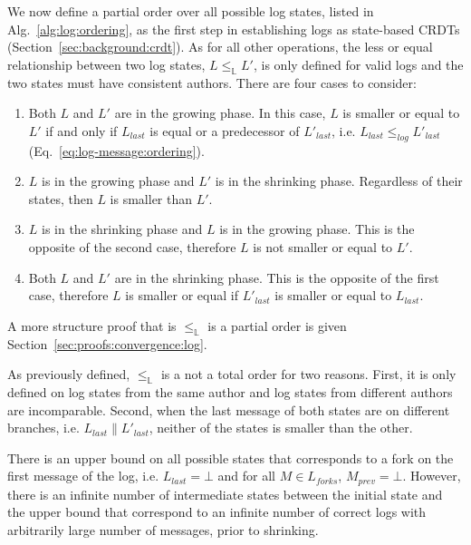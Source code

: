 \documentclass[9pt, oneside]{article}   	%
\begin{document}
We now define a partial order over all possible log states, listed in Alg.~\ref{alg:log:ordering}, as the first step in establishing logs as state-based CRDTs (Section~\ref{sec:background:crdt}). As for all other operations, the less or equal relationship between two log states, $L \leq_\mathds{L} L'$, is only defined for valid logs and the two states must have consistent authors. There are four cases to consider:
\begin{enumerate}
	\item Both $L$ and $L'$ are in the growing phase. In this case, $L$ is smaller or equal to $L'$ if and only if $L_\textit{last}$ is equal or a predecessor of $L'_\textit{last}$, i.e. $L_\textit{last} \leq_\textit{log} L'_\textit{last}$ (Eq.~\ref{eq:log-message:ordering}).

	\item $L$ is in the growing phase and $L'$ is in the shrinking phase. Regardless of their states, then $L$ is smaller than $L'$.

	\item $L$ is in the shrinking phase and $L$ is in the growing phase. This is the opposite of the second case, therefore $L$ is not smaller or equal to $L'$.
	\item Both $L$ and $L'$ are in the shrinking phase. This is the opposite of the first case, therefore $L$ is smaller or equal if $L'_\textit{last}$ is smaller or equal to $L_\textit{last}$. 
\end{enumerate}

A more structure proof that is $\leq_\mathds{L}$ is a partial order is given Section~\ref{sec:proofs:convergence:log}.

As previously defined, $\leq_\mathds{L}$ is a not a total order for two reasons. First, it is only defined on log states from the same author and log states from different authors are incomparable. Second, when the last message of both states are on different branches, i.e. $L_\textit{last} \parallel L'_\textit{last}$, neither of the states is smaller than the other.

There is an upper bound on all possible states that corresponds to a fork on the first message of the log,  i.e. $L_\textit{last} = \bot$ and for all $M \in L_\textit{forks}$, $M_\textit{prev} = \bot$. However, there is an infinite number of intermediate states between the initial state and the upper bound that correspond to an infinite number of correct logs with arbitrarily large number of messages, prior to shrinking.
\end{document}
